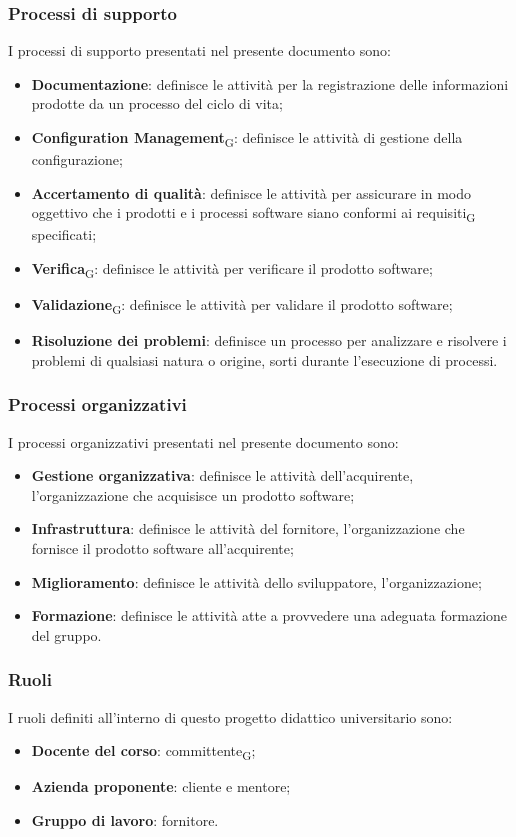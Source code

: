 \subsubsection{Processi di supporto}
I processi di supporto presentati nel presente documento sono:
\begin{itemize}
\item \textbf{Documentazione}: definisce le attività per la registrazione delle informazioni prodotte da un processo del ciclo di vita;
\item \textbf{Configuration Management}\textsubscript{G}: definisce le attività di gestione della configurazione;
\item \textbf{Accertamento di qualità}: definisce le attività per assicurare in modo oggettivo che i prodotti e i processi software siano conformi ai requisiti\textsubscript{G} specificati;
\item \textbf{Verifica}\textsubscript{G}: definisce le attività per verificare il prodotto software;
\item \textbf{Validazione}\textsubscript{G}: definisce le attività per validare il prodotto software;
\item \textbf{Risoluzione dei problemi}: definisce un processo per analizzare e risolvere i problemi di qualsiasi natura o origine, sorti durante l’esecuzione di processi.
\end{itemize}


\subsubsection{Processi organizzativi}
I processi organizzativi presentati nel presente documento sono:
\begin{itemize}
\item \textbf{Gestione organizzativa}: definisce le attività dell’acquirente, l’organizzazione che acquisisce un prodotto software;
\item \textbf{Infrastruttura}: definisce le attività del fornitore, l’organizzazione che fornisce il prodotto software all’acquirente;
\item \textbf{Miglioramento}: definisce le attività dello sviluppatore, l’organizzazione;
\item \textbf{Formazione}: definisce le attività atte a provvedere una adeguata formazione del gruppo.
\end{itemize}

\subsubsection{Ruoli}
I ruoli definiti all’interno di questo progetto didattico universitario sono:
\begin{itemize}
\item \textbf{Docente del corso}: committente\textsubscript{G};
\item \textbf{Azienda proponente}: cliente e mentore;
\item \textbf{Gruppo di lavoro}: fornitore.
\end{itemize}